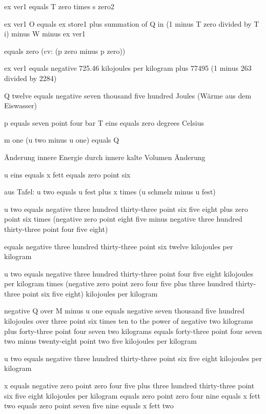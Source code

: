 ex ver1 equals T zero times s zero2

ex ver1 O equals ex store1 plus summation of Q in (1 minus T zero divided by T i) minus W minus ex ver1

equals zero (cv: (p zero minus p zero))

ex ver1 equals negative 725.46 kilojoules per kilogram plus 77495 (1 minus 263 divided by 2284)

Q twelve equals negative seven thousand five hundred Joules (Wärme aus dem Eiswasser)

p equals seven point four bar  
T eins equals zero degrees Celsius

m one (u two minus u one) equals Q  

Änderung innere Energie durch innere kalte Volumen Änderung

u eins equals x fett equals zero point six

aus Tafel:  
u two equals u fest plus x times (u schmelz minus u fest)

u two equals negative three hundred thirty-three point six five eight plus zero point six times (negative zero point eight five minus negative three hundred thirty-three point four five eight)

equals negative three hundred thirty-three point six twelve kilojoules per kilogram

u two equals negative three hundred thirty-three point four five eight kilojoules per kilogram times (negative zero point zero four five plus three hundred thirty-three point six five eight) kilojoules per kilogram

negative Q over M minus u one equals negative seven thousand five hundred kilojoules over three point six times ten to the power of negative two kilograms plus forty-three point four seven two kilograms equals forty-three point four seven two minus twenty-eight point two five kilojoules per kilogram

u two equals negative three hundred thirty-three point six five eight kilojoules per kilogram

x equals negative zero point zero four five plus three hundred thirty-three point six five eight kilojoules per kilogram equals zero point zero four nine equals x fett two equals zero point seven five nine equals x fett two